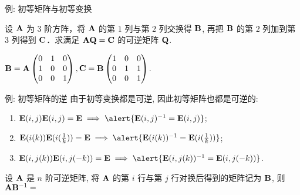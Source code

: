 \begin{frame}{例: 初等矩阵与初等变换}
	\onslide<+->
	\begin{example}
		设 ${\mathbf{A}}$ 为 $3$ 阶方阵，将 ${\mathbf{A}}$ 的第 $1$ 列与第 $2$ 列交换得 $\bf	B$, 再把 ${\mathbf{B}}$ 的第 $2$ 列加到第 $3$ 列得到 ${\mathbf{C}}$．求满足 ${\mathbf{A}}{\mathbf{Q}}={\mathbf{C}}$ 的可逆矩阵 ${\mathbf{Q}}$.
	\end{example}
	\onslide<+->
	\begin{solution}
		${\mathbf{B}}={\mathbf{A}}\begin{pmatrix}
			0&1&0\\1&0&0\\0&0&1
		\end{pmatrix},{\mathbf{C}}={\mathbf{B}}\begin{pmatrix}
			1&0&0\\0&1&1\\0&0&1
		\end{pmatrix}$.
		\onslide<+->{因此
		\[\bfQ=\begin{pmatrix}
			0&1&0\\1&0&0\\0&0&1
		\end{pmatrix}\begin{pmatrix}
			1&0&0\\0&1&1\\0&0&1
		\end{pmatrix}=\begin{pmatrix}
			0&1&1\\1&0&0\\0&0&1
		\end{pmatrix}.\]}
	\end{solution}
\end{frame}


\begin{frame}{例: 初等矩阵的逆}
	\onslide<+->
	由于初等变换都是可逆, 因此初等矩阵也都是可逆的:
	\onslide<+->
	\begin{enumerate}
		\item $\bfE(i,j)\bfE(i,j)=\bfE\implies \alert{\bfE(i,j)^{-1}=\bfE(i,j)}$;
		\item $\bfE(i(k))\bfE(i(\frac1k))=\bfE\implies\alert{\bfE(i(k))^{-1}=\bfE(i(\frac1k))}$;
		\item $\bfE(i,j(k))\bfE(i,j(-k))=\bfE\implies\alert{\bfE(i,j(k))^{-1}=\bfE(i,j(-k))}$.
	\end{enumerate}
	\onslide<+->
	\begin{example}
		设 ${\mathbf{A}}$ 是 $n$ 阶可逆矩阵, 将 ${\mathbf{A}}$ 的第 $i$ 行与第 $j$ 行对换后得到的矩阵记为 ${\mathbf{B}}$, 则 ${\mathbf{A}}{\mathbf{B}}^{-1}=$
	\end{example}
\end{frame}



